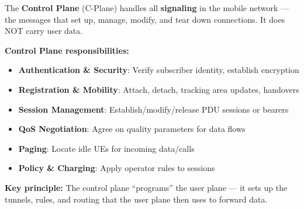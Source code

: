 
The \textbf{Control Plane} (C-Plane) handles all \textbf{signaling} in the mobile network — the messages that set up, manage, modify, and tear down connections. It does NOT carry user data.

\textbf{Control Plane responsibilities:}

\begin{itemize}
\tightlist
\item
  \textbf{Authentication \& Security}: Verify subscriber identity, establish encryption
\item
  \textbf{Registration \& Mobility}: Attach, detach, tracking area updates, handovers
\item
  \textbf{Session Management}: Establish/\allowbreak{}modify/\allowbreak{}release PDU sessions or bearers
\item
  \textbf{QoS Negotiation}: Agree on quality parameters for data flows
\item
  \textbf{Paging}: Locate idle UEs for incoming data/\allowbreak{}calls
\item
  \textbf{Policy \& Charging}: Apply operator rules to sessions
\end{itemize}

\textbf{Key principle:} The control plane ``programs'' the user plane — it sets up the tunnels, rules, and routing that the user plane then uses to forward data.



